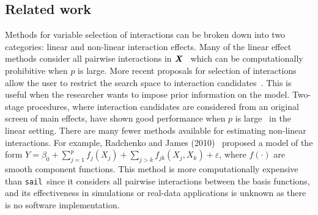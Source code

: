 \documentclass[useAMS,usenatbib,referee]{biom}
\newcommand{\sail}{\texttt{sail}}
\newcommand{\bX}{\textbf{\emph{X}}}
\newcommand{\balpha}{\boldsymbol{\alpha}}
\newcommand{\mb}[1]{\mathbf{#1}}
\begin{document}
\subsection{Related work}
Methods for variable selection of interactions can be broken down into two categories: linear and non-linear interaction effects.
Many of the linear effect methods consider all pairwise interactions in $\bX$~\citep{zhao2009composite,choi2010variable,bien2013lasso, she2014group} which can be computationally prohibitive when $p$ is large. 
More recent proposals for selection of interactions allow the user to restrict the search space to interaction candidates~\citep{lim2015learning,haris2016convex}. 
This is useful when the researcher wants to impose prior information on the model.
Two-stage procedures, where interaction candidates are considered from an original screen of main effects, have shown good performance when $p$ is large~\citep{hao2018model,shah2016modelling} in the linear setting.
There are many fewer methods available for estimating non-linear interactions. 
For example, Radchenko and James (2010)~\citep{radchenko2010variable} proposed a model of the form $Y = \beta_0 + \sum_{j=1}^{p} f_j(X_j) + \sum_{j>k}f_{jk}(X_j, X_k) + \varepsilon$, where $f(\cdot)$ are smooth component functions. 
This method is more computationally expensive than \sail ~since it considers all pairwise interactions between the basis functions, and its effectiveness in simulations or real-data applications is unknown as there is no software implementation.

\end{document}
